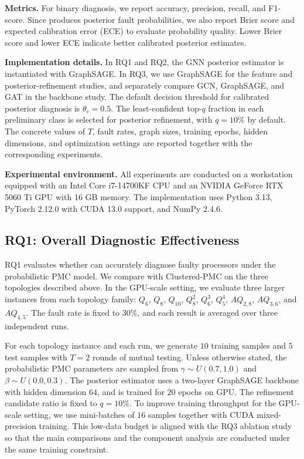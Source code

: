 \noindent \textbf{Metrics.}
For binary diagnosis, we report accuracy, precision, recall, and F1-score. Since \tool produces posterior fault probabilities, we also report Brier score and expected calibration error (ECE) to evaluate probability quality. Lower Brier score and lower ECE indicate better calibrated posterior estimates.

\noindent \textbf{Implementation details.}
In RQ1 and RQ2, the GNN posterior estimator is instantiated with GraphSAGE. In RQ3, we use GraphSAGE for the feature and posterior-refinement studies, and separately compare GCN, GraphSAGE, and GAT in the backbone study. The default decision threshold for calibrated posterior diagnosis is $\theta_c=0.5$. The least-confident top-$q$ fraction in each preliminary class is selected for posterior refinement, with $q=10\%$ by default. The concrete values of $T$, fault rates, graph sizes, training epochs, hidden dimensions, and optimization settings are reported together with the corresponding experiments.

\noindent \textbf{Experimental environment.}
All experiments are conducted on a workstation equipped with an Intel Core i7-14700KF CPU and an NVIDIA GeForce RTX 5060 Ti GPU with 16 GB memory. The implementation uses Python 3.13, PyTorch 2.12.0 with CUDA 13.0 support, and NumPy 2.4.6. 

\subsection{RQ1: Overall Diagnostic Effectiveness}
\label{subsec:rq1}

RQ1 evaluates whether \tool can accurately diagnose faulty processors under the probabilistic PMC model. We compare \tool with Clustered-PMC on the three topologies described above. In the GPU-scale setting, we evaluate three larger instances from each topology family: $Q_6$, $Q_8$, $Q_{10}$, $Q_8^2$, $Q_6^3$, $Q_5^4$, $AQ_{2,8}$, $AQ_{3,6}$, and $AQ_{4,5}$. The fault rate is fixed to $30\%$, and each result is averaged over three independent runs.

For each topology instance and each run, we generate $10$ training samples and $5$ test samples with $T=2$ rounds of mutual testing. Unless otherwise stated, the probabilistic PMC parameters are sampled from $\gamma \sim U(0.7, 1.0)$ and $\beta \sim U(0.0, 0.3)$. The posterior estimator uses a two-layer GraphSAGE backbone with hidden dimension $64$, and is trained for $20$ epochs on GPU. The refinement candidate ratio is fixed to $q=10\%$. To improve training throughput for the GPU-scale setting, we use mini-batches of $16$ samples together with CUDA mixed-precision training. This low-data budget is aligned with the RQ3 ablation study so that the main comparisons and the component analysis are conducted under the same training constraint.

